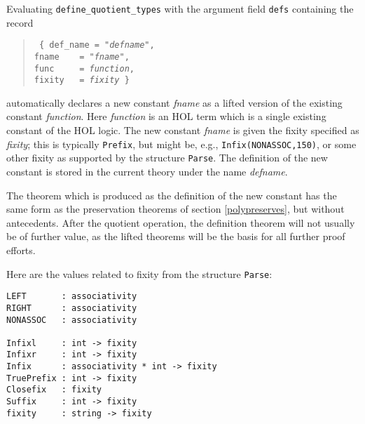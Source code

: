 \documentclass[envcountsame,runningheads]{llncs}
\begin{document}
Evaluating {\tt define\_quotient\_types} with the
argument
field {\tt defs}
containing the record
\begin{verse} \tt
\hspace{\parindent}
\hspace{2.0cm}
\{
def\_name = "{\it defname}", \\
\hspace{2.0cm}
fname \ \ \ = "{\it fname}", \\
\hspace{2.0cm}
func \ \ \ \ = {\it function}, \\
\hspace{2.0cm}
fixity \ \ = {\it fixity} \} \\
\end{verse}

\noindent
automatically declares a new constant {\it fname}
as a lifted version of the existing constant {\it function}.
Here {\it function} is an HOL term which is a single existing constant
of the HOL logic.
The new constant {\it fname} is given the fixity specified as {\it fixity};
this is typically {\tt Prefix}, but might be, e.g.,
{\tt Infix(NONASSOC,150)},
or some other fixity
as supported by the structure {\tt Parse}.
The definition of the new constant is stored in the current theory
under the name {\it defname}.

The theorem which is produced as the definition of the new constant
has the same form as the preservation theorems of section \ref{polypreserves},
but without antecedents.
After the quotient operation,
the definition theorem will not usually be of further value, as
the lifted theorems will be the basis for all further proof efforts.

Here are the values related to fixity from the structure {\tt Parse}:
\begin{verbatim}
LEFT       : associativity
RIGHT      : associativity
NONASSOC   : associativity

Infixl     : int -> fixity
Infixr     : int -> fixity
Infix      : associativity * int -> fixity
TruePrefix : int -> fixity
Closefix   : fixity
Suffix     : int -> fixity
fixity     : string -> fixity
\end{verbatim}
\end{document}

